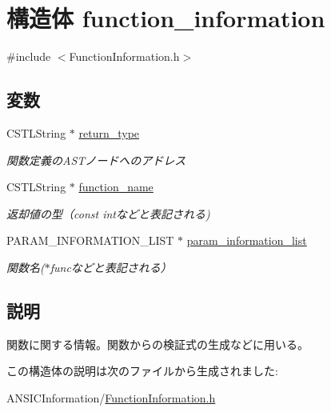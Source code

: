 \section{構造体 function\_\-information}
\label{structfunction__information}


{\ttfamily \#include $<$FunctionInformation.h$>$}

\subsection*{変数}
\begin{DoxyCompactItemize}
\item 
CSTLString $\ast$ \hyperlink{structfunction__information_a2b02003e288d807bc956d740d56e7e0b}{return\_\-type}\label{structfunction__information_a2b02003e288d807bc956d740d56e7e0b}

\begin{DoxyCompactList}\small\item\em 関数定義のASTノードへのアドレス \item\end{DoxyCompactList}\item 
CSTLString $\ast$ \hyperlink{structfunction__information_aa138620bc112025eb61bda9efa4e2f24}{function\_\-name}\label{structfunction__information_aa138620bc112025eb61bda9efa4e2f24}

\begin{DoxyCompactList}\small\item\em 返却値の型（const intなどと表記される) \item\end{DoxyCompactList}\item 
PARAM\_\-INFORMATION\_\-LIST $\ast$ \hyperlink{structfunction__information_a494d2b5b09c191eda0f90b9bf8adc952}{param\_\-information\_\-list}\label{structfunction__information_a494d2b5b09c191eda0f90b9bf8adc952}

\begin{DoxyCompactList}\small\item\em 関数名($\ast$funcなどと表記される） \item\end{DoxyCompactList}\end{DoxyCompactItemize}


\subsection{説明}
関数に関する情報。関数からの検証式の生成などに用いる。 

この構造体の説明は次のファイルから生成されました:\begin{DoxyCompactItemize}
\item 
ANSICInformation/\hyperlink{FunctionInformation_8h}{FunctionInformation.h}\end{DoxyCompactItemize}
